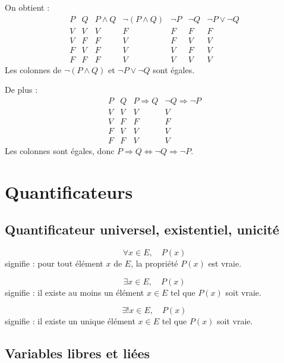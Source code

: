\documentclass[11pt,a4paper]{article}
\newcommand{\non}{\neg}
\newcommand{\et}{\wedge}
\newcommand{\ou}{\vee}
\newcommand{\imp}{\Rightarrow}
\newcommand{\ssi}{\Longleftrightarrow}
\begin{document}
\begin{correctionbox}[2]
On obtient :
\[
\begin{array}{c|c|c|c|c|c|c}
P&Q&P\et Q&\non(P\et Q)&\non P&\non Q&\non P\ou\non Q\\
\hline
V&V&V&F&F&F&F\\
V&F&F&V&F&V&V\\
F&V&F&V&V&F&V\\
F&F&F&V&V&V&V
\end{array}
\]
Les colonnes de \(\non(P\et Q)\) et \(\non P\ou\non Q\) sont égales.

De plus :
\[
\begin{array}{c|c|c|c}
P&Q&P\imp Q&\non Q\imp\non P\\
\hline
V&V&V&V\\
V&F&F&F\\
F&V&V&V\\
F&F&V&V
\end{array}
\]
Les colonnes sont égales, donc \(P\imp Q\ssi\non Q\imp\non P\).
\end{correctionbox}

\section{Quantificateurs}

\subsection{Quantificateur universel, existentiel, unicité}

\begin{definitionbox}[\(\forall\)]
\[
\forall x\in E,\quad P(x)
\]
signifie : pour tout élément \(x\) de \(E\), la propriété \(P(x)\) est vraie.
\end{definitionbox}

\begin{definitionbox}[\(\exists\)]
\[
\exists x\in E,\quad P(x)
\]
signifie : il existe au moins un élément \(x\in E\) tel que \(P(x)\) soit vraie.
\end{definitionbox}

\begin{definitionbox}[\(\exists!\)]
\[
\exists!x\in E,\quad P(x)
\]
signifie : il existe un unique élément \(x\in E\) tel que \(P(x)\) soit vraie.
\end{definitionbox}

\subsection{Variables libres et liées}
\end{document}
